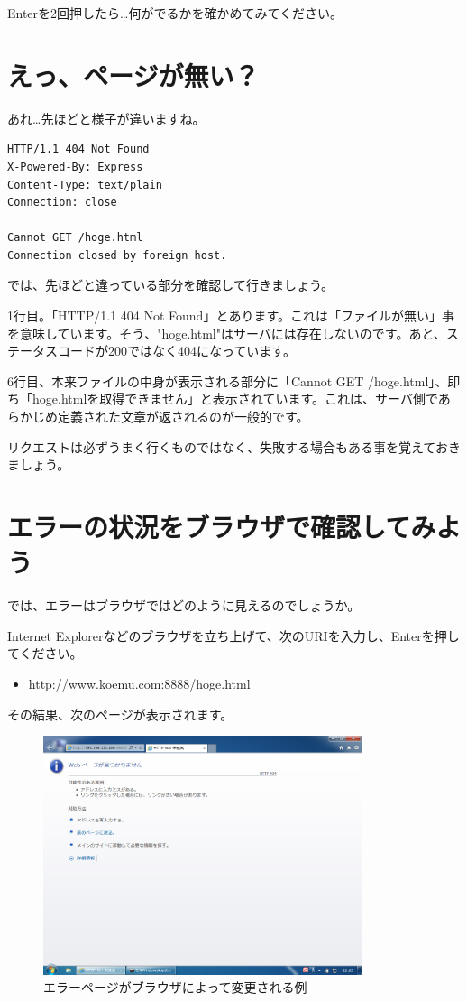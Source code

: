 \documentclass[a4j,11pt,openany]{jsbook}
\begin{document}
Enterを2回押したら…何がでるかを確かめてみてください。

\section{えっ、ページが無い？}

あれ…先ほどと様子が違いますね。

\begin{lstlisting}
HTTP/1.1 404 Not Found
X-Powered-By: Express
Content-Type: text/plain
Connection: close

Cannot GET /hoge.html
Connection closed by foreign host.
\end{lstlisting}

では、先ほどと違っている部分を確認して行きましょう。

1行目。「HTTP/1.1 404 Not Found」とあります。これは「ファイルが無い」事を意味しています。そう、"hoge.html"はサーバには存在しないのです。あと、ステータスコードが200ではなく404になっています。

6行目、本来ファイルの中身が表示される部分に「Cannot GET /hoge.html」、即ち「hoge.htmlを取得できません」と表示されています。これは、サーバ側であらかじめ定義された文章が返されるのが一般的です。

リクエストは必ずうまく行くものではなく、失敗する場合もある事を覚えておきましょう。

\section{エラーの状況をブラウザで確認してみよう}

では、エラーはブラウザではどのように見えるのでしょうか。

Internet Explorerなどのブラウザを立ち上げて、次のURIを入力し、Enterを押してください。

\begin{itemize}
    \item http://www.koemu.com:8888/hoge.html
\end{itemize}

その結果、次のページが表示されます。

\begin{figure}[H]
    \begin{center}
        \includegraphics[height=7cm]{./404.png}
        \caption{エラーページがブラウザによって変更される例}
        \label{404}
    \end{center}
\end{figure}
\end{document}
